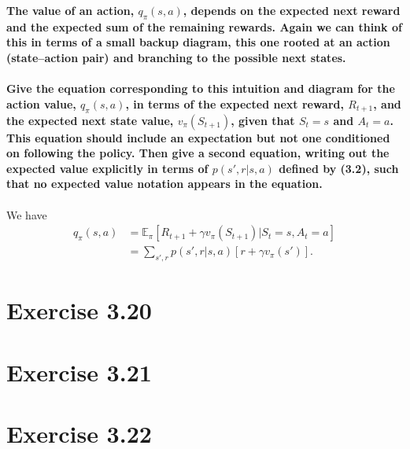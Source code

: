 \documentclass[a4paper,11pt]{article}
\numberwithin{equation}{section}
\theoremstyle{remark}
\newcommand{\E}{\mathbb E}
\begin{document}
\textbf{The value of an action, $q_\pi(s, a)$, depends on the expected next reward and the expected sum of the remaining rewards. Again we can think of this in terms of a small backup diagram, this one rooted at an action (state–action pair) and branching to the possible next states.
\\ \\
Give the equation corresponding to this intuition and diagram for the action value, $q_\pi(s, a)$, in terms of the expected next reward, $R_{t+1}$, and the expected next state value, $v_\pi(S_{t+1})$, given that $S_t =s$ and $A_t =a$. This equation should include an expectation but not one conditioned on following the policy. Then give a second equation, writing out the expected value explicitly in terms of $p(s', r|s, a)$ defined by (3.2), such that no expected value notation appears in the equation.}
\\ \\
We have 
\begin{align*}
	q_\pi(s, a) & = \E_\pi[R_{t+1} + \gamma v_\pi(S_{t+1}) | S_t = s, A_t = a] \\
			    & = \sum_{s', r} p(s', r | s, a)[r + \gamma v_\pi(s')].
\end{align*}

\section{Exercise 3.20}


\section{Exercise 3.21}


\section{Exercise 3.22}
\end{document}
